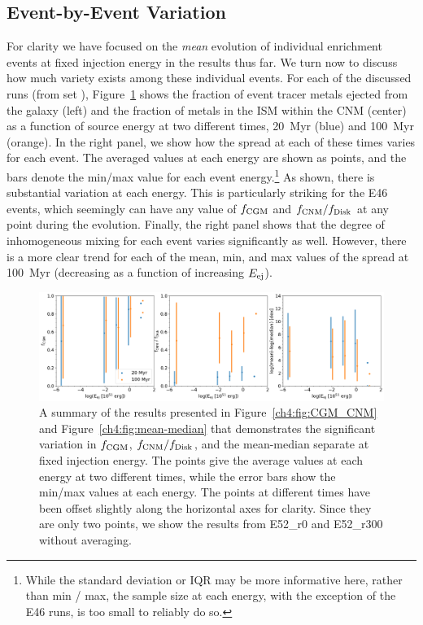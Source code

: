 \subsection{Event-by-Event Variation}
\label{ch4:sec:individual event variation}

For clarity we have focused on the \textit{mean} evolution of individual enrichment events at fixed injection energy in the results thus far. We turn now to discuss how much variety exists among these individual events. For each of the discussed runs (from set \runonenu), Figure~\ref{ch4:fig:CGM_CNM_variance} shows the fraction of event tracer metals ejected from the galaxy (left) and the fraction of metals in the ISM within the CNM (center) as a function of source energy at two different times, 20~Myr (blue) and 100~Myr (orange). In the right panel, we show how the spread at each of these times varies for each event. The averaged values at each energy are shown as points, and the bars denote the min/max value for each event energy.\footnote{While the standard deviation or IQR may be more informative here, rather than min / max, the sample size at each energy, with the exception of the E46 runs, is too small to reliably do so.} As shown, there is substantial variation at each energy. This is particularly striking for the E46 events, which seemingly can have any value of $f_{\rm CGM}$ and $f_{\rm CNM} / f_{\rm Disk}$ at any point during the evolution. Finally, the right panel shows that the degree of inhomogeneous mixing for each event varies significantly as well. However, there is a more clear trend for each of the mean, min, and max values of the spread at 100~Myr (decreasing as a function of increasing $E_{\rm ej}$).

 \begin{figure}
   \centering
   \includegraphics[width=0.975\linewidth]{figures/ch4/II_Eej_CNM_avg}
   \caption{A summary of the results presented in Figure~\ref{ch4:fig:CGM_CNM} and Figure~\ref{ch4:fig:mean-median} that demonstrates the significant variation in $f_{\rm CGM}$, $f_{\rm CNM} / f_{\rm Disk}$, and the mean-median separate at fixed injection energy. The points give the average values at each energy at two different times, while the error bars show the min/max values at each energy. The points at different times have been offset slightly along the horizontal axes for clarity. Since they are only two points, we show the results from \runone E52\_r0 and \runone E52\_r300 without averaging.}
   \label{ch4:fig:CGM_CNM_variance}
 \end{figure}


